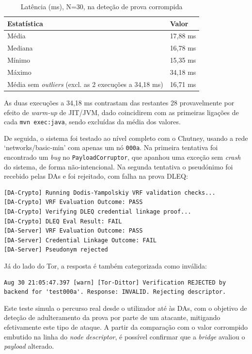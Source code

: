 \begin{table}[h]
    \centering
    \renewcommand{\arraystretch}{1.4}
    \begin{tabular}{|p{}|p{}|}
    \hline
    \textbf{Estatística} & \textbf{Valor} \\
    \hline
    Média & 17,88 ms \\
    \hline
    Mediana & 16,78 ms \\
    \hline
    Mínimo & 15,35 ms \\
    \hline
    Máximo & 34,18 ms \\
    \hline
    Média sem \textit{outliers} (excl. as 2 execuções a 34,18 ms) & 16,71 ms \\
    \hline
    \end{tabular}
    \caption{Latência (ms), N=30, na deteção de prova corrompida}
    \label{tab:latencia_prova_invalida}
\end{table}

As duas execuções a 34,18 ms contrastam das restantes 28 provavelmente por efeito de \textit{warm-up} de JIT/JVM, dado coincidirem com as primeiras ligações de cada \texttt{mvn exec:java}, sendo excluídas da média dos valores.

De seguida, o sistema foi testado ao nível completo com o Chutney, usando a rede `networks/basic-min' com apenas um nó \texttt{000a}. Na primeira tentativa foi encontrado um \textit{bug} no \texttt{PayloadCorruptor}, que apanhou uma exceção sem \textit{crash} do sistema, de forma não-intencional. Na segunda tentativa o pseudónimo foi recebido pelas DAs e foi rejeitado, com falha na prova DLEQ:

\begin{lstlisting}
[DA-Crypto] Running Dodis-Yampolskiy VRF validation checks...
[DA-Crypto] VRF Evaluation Outcome: PASS
[DA-Crypto] Verifying DLEQ credential linkage proof...
[DA-Crypto] DLEQ Eval Result: FAIL
[DA-Server] VRF Evaluation Outcome: PASS
[DA-Server] Credential Linkage Outcome: FAIL
[DA-Server] Pseudonym rejected
\end{lstlisting}

Já do lado do Tor, a resposta é também categorizada como inválida:

\begin{lstlisting}
Aug 30 21:05:47.397 [warn] [Tor-Dittor] Verification REJECTED by backend for 'test000a'. Response: INVALID. Rejecting descriptor.
\end{lstlisting}

Este teste simula o percurso real desde o utilizador até às DAs, com o objetivo de deteção de adulteramento da prova por parte de um atacante, mitigando efetivamente este tipo de ataque. A partir da comparação com o valor corrompido embutido na linha do \textit{node descriptor}, é possível confirmar que a \textit{bridge} avaliou o \textit{payload} alterado.

